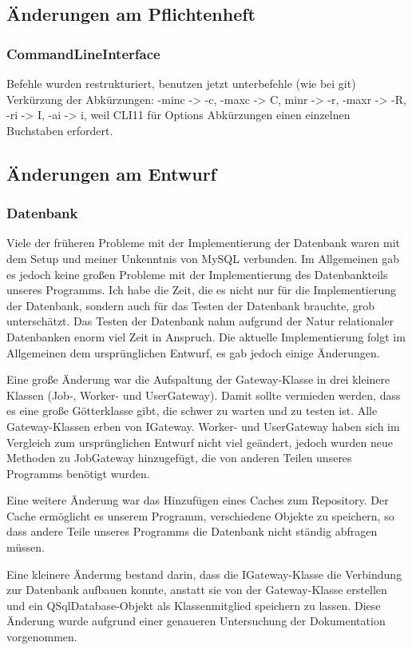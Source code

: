 \documentclass[a4paper,12pt]{article}
\begin{document}
\subsection{Änderungen am Pflichtenheft}
\subsubsection{CommandLineInterface}
\vspace{0.2cm}
Befehle wurden restrukturiert, benutzen jetzt unterbefehle (wie bei git)
Verkürzung der Abkürzungen: -minc -> -c, -maxc -> C, minr -> -r, -maxr -> -R, -ri -> I, -ai -> i, weil CLI11 für Options Abkürzungen einen einzelnen Buchstaben erfordert.

\subsection{Änderungen am Entwurf}
\subsubsection{Datenbank}
\vspace{0.2cm}
Viele der früheren Probleme mit der Implementierung der Datenbank waren mit dem Setup und meiner Unkenntnis von MySQL verbunden. Im Allgemeinen gab es jedoch keine großen Probleme mit der Implementierung des Datenbankteils unseres Programms. Ich habe die Zeit, die es nicht nur für die Implementierung der Datenbank, sondern auch für das Testen der Datenbank brauchte, grob unterschätzt. Das Testen der Datenbank nahm aufgrund der Natur relationaler Datenbanken enorm viel Zeit in Anspruch. Die aktuelle Implementierung folgt im Allgemeinen dem ursprünglichen Entwurf, es gab jedoch einige Änderungen.\par 
\vspace{5mm}
Eine große Änderung war die Aufspaltung der Gateway-Klasse in drei kleinere Klassen (Job-, Worker- und UserGateway). Damit sollte vermieden werden, dass es eine große Götterklasse gibt, die schwer zu warten und zu testen ist. Alle Gateway-Klassen erben von IGateway. Worker- und UserGateway haben sich im Vergleich zum ursprünglichen Entwurf nicht viel geändert, jedoch wurden neue Methoden zu JobGateway hinzugefügt, die von anderen Teilen unseres Programms benötigt wurden.\par
\vspace{5mm}
Eine weitere Änderung war das Hinzufügen eines Caches zum Repository. Der Cache ermöglicht es unserem Programm, verschiedene Objekte zu speichern, so dass andere Teile unseres Programms die Datenbank nicht ständig abfragen müssen.\par
\vspace{5mm}
Eine kleinere Änderung bestand darin, dass die IGateway-Klasse die Verbindung zur Datenbank aufbauen konnte, anstatt sie von der Gateway-Klasse erstellen und ein QSqlDatabase-Objekt als Klassenmitglied speichern zu lassen. Diese Änderung wurde aufgrund einer genaueren Untersuchung der Dokumentation vorgenommen.
\end{document}
